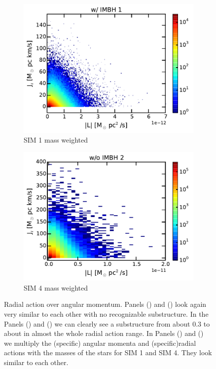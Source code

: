 \begin{figure}[htbp]
\begin{subfigure}{0.475\textwidth}
		\includegraphics[width=\textwidth]{Plots/L_J_r_mass_hist_IMBH1.pdf}
		\caption{SIM 1 mass weighted}
		\label{fig:L_J_r_mass_hist_IMBH1}
	\end{subfigure}
	\hfill
	\begin{subfigure}{0.475\textwidth}
		\includegraphics[width=\textwidth]{Plots/L_J_r_mass_hist_noIMBH2.pdf}
		\caption{SIM 4 mass weighted}
		\label{fig:L_J_r_mass_hist_noIMBH2}
	\end{subfigure}
	\caption{Radial action over angular momentum. Panels () and () look again very similar to each other with no recognizable substructure. In the Panels () and () we can clearly see a substructure from about 0.3 to about  in almost the whole radial action range. In Panels () and () we multiply the (specific) angular momenta and (specific)radial actions with the masses of the stars for SIM 1 and SIM 4. They look similar to each other.}
	\label{fig:L_J_r_hist}
\end{figure}

